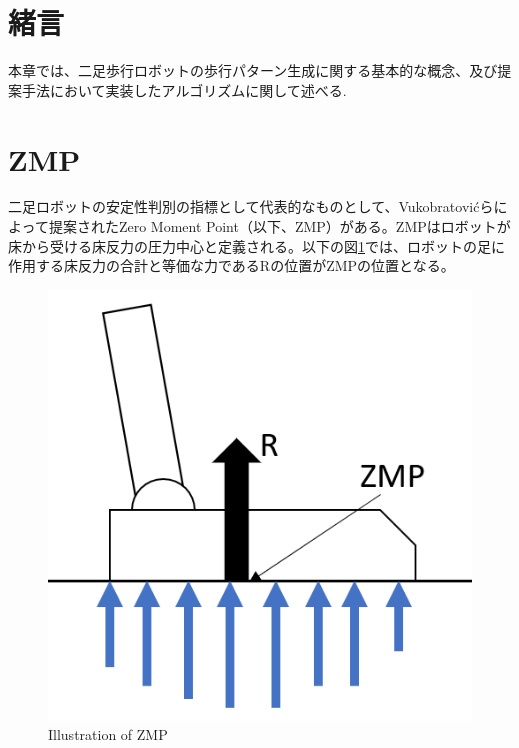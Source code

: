 \section{緒言}
本章では、二足歩行ロボットの歩行パターン生成に関する基本的な概念、及び提案手法において実装したアルゴリズムに関して述べる.


\section{ZMP}
二足ロボットの安定性判別の指標として代表的なものとして、Vukobratovićらによって提案されたZero Moment Point（以下、ZMP）\cite{VUKOBRATOVIC19721}がある。ZMPはロボットが床から受ける床反力の圧力中心と定義される。以下の図\ref{Fig:zmpillust}では、ロボットの足に作用する床反力の合計と等価な力であるRの位置がZMPの位置となる。

\begin{figure}[hbtp]
  \centering
  \includegraphics[keepaspectratio, scale=0.6]
  {images/zmp_ilust.png}
  \caption{Illustration of ZMP }
  \label{Fig:zmpillust}
\end{figure}
\newpage

